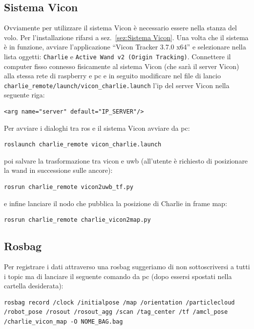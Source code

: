 \subsection*{Sistema Vicon}
Ovviamente per utilizzare il sistema Vicon \`e necessario essere nella stanza del volo. 
Per l'installazione rifarsi a sez.~\ref{sez:Sistema Vicon}. 
Una volta che il sistema \`e in funzione, avviare l'applicazione ``Vicon Tracker 3.7.0 x64'' e selezionare nella lista oggetti: \texttt{Charlie} e \texttt{Active Wand v2 (Origin Tracking)}. 
Connettere il computer fisso connesso fisicamente al sistema Vicon (che sar\`a il server Vicon) alla stessa rete di raspberry e pc e in seguito modificare nel file di lancio \texttt{charlie\_remote/launch/vicon\_charlie.launch} l'ip del server Vicon nella seguente riga:
\begin{lstlisting}[style=xml, firstnumber=6]
	<arg name="server" default="IP_SERVER"/>
\end{lstlisting}

Per avviare i dialoghi tra ros e il sistema Vicon avviare da pc:
\begin{lstlisting}[style=bashPC]
	roslaunch charlie_remote vicon_charlie.launch
\end{lstlisting}

poi salvare la trasformazione tra vicon e uwb (all'utente \`e richiesto di posizionare la wand in successione sulle ancore):
\begin{lstlisting}[style=bashPC]
	rosrun charlie_remote vicon2uwb_tf.py
\end{lstlisting}

e infine lanciare il nodo che pubblica la posizione di Charlie in frame map:
\begin{lstlisting}[style=bashPC]
	rosrun charlie_remote charlie_vicon2map.py
\end{lstlisting}


\subsection*{Rosbag}
Per registrare i dati attraverso una rosbag suggeriamo di non sottoscriversi a tutti i topic ma di lanciare il seguente comando da pc (dopo essersi spostati nella cartella desiderata):
\begin{lstlisting}[style=bashPC]
	rosbag record /clock /initialpose /map /orientation /particlecloud /robot_pose /rosout /rosout_agg /scan /tag_center /tf /amcl_pose /charlie_vicon_map -O NOME_BAG.bag
\end{lstlisting}

